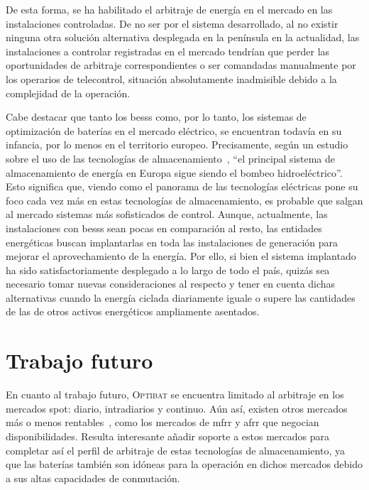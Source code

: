 De esta forma, se ha habilitado el arbitraje de energía en el mercado en las instalaciones controladas. De no ser por el sistema desarrollado, al no existir ninguna otra solución alternativa desplegada en la península en la actualidad, las instalaciones a controlar registradas en el mercado tendrían que perder las oportunidades de arbitraje correspondientes o ser comandadas manualmente por los operarios de telecontrol, situación absolutamente inadmisible debido a la complejidad de la operación.

Cabe destacar que tanto los \glspl{bess} como, por lo tanto, los sistemas de optimización de baterías en el mercado eléctrico, se encuentran todavía en su infancia, por lo menos en el territorio europeo. Precisamente, según un estudio sobre el uso de las tecnologías de almacenamiento~\cite{hu2022potential}, ``el principal sistema de almacenamiento de energía en Europa sigue siendo el bombeo hidroeléctrico''. Esto significa que, viendo como el panorama de las tecnologías eléctricas pone su foco cada vez más en estas tecnologías de almacenamiento, es probable que salgan al mercado sistemas más sofisticados de control. Aunque, actualmente, las instalaciones con \glspl{bess} sean pocas en comparación al resto, las entidades energéticas buscan implantarlas en toda las instalaciones de generación para mejorar el aprovechamiento de la energía. Por ello, si bien el sistema implantado ha sido satisfactoriamente desplegado a lo largo de todo el país, quizás sea necesario tomar nuevas consideraciones al respecto y tener en cuenta dichas alternativas cuando la energía ciclada diariamente iguale o supere las cantidades de las de otros activos energéticos ampliamente asentados.

\section{Trabajo futuro}
\label{makereference8.2}

En cuanto al trabajo futuro, \textsc{Optibat} se encuentra limitado al arbitraje en los mercados spot: diario, intradiarios y continuo. Aún así, existen otros mercados más o menos rentables~\cite{cnmc2024balance}, como los mercados de \gls{mfrr} y \gls{afrr} que negocian disponibilidades. Resulta interesante añadir soporte a estos mercados para completar así el perfil de arbitraje de estas tecnologías de almacenamiento, ya que las baterías también son idóneas para la operación en dichos mercados debido a sus altas capacidades de conmutación.

